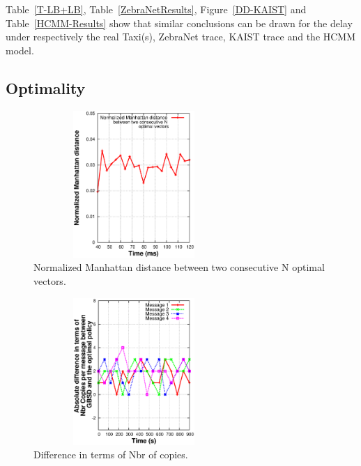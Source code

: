 Table~\ref{T-LB+LB}, Table~\ref{ZebraNetResults}, Figure~\ref{DD-KAIST} and Table~\ref{HCMM-Results} show that similar conclusions can be drawn for the delay under respectively the real Taxi(s), ZebraNet trace, KAIST trace and the HCMM model. 

\subsection{Optimality}
\label{GBSD:Optimality}

\begin{figure}[!h]
\centering
\includegraphics[width=3in,height=2.2in]{Chapitre3/AvgDistancePerCoordinate.eps}
\caption{Normalized Manhattan distance between two consecutive N optimal vectors.}
\label{Sensitivity}
\end{figure}

\begin{figure}[!h]
\centering
\includegraphics[width=3in,height=2.2in]{Chapitre3/NbrCopiesDiff.eps}
\caption{Difference in terms of Nbr of copies.}
\label{DiffinTermsOfNbrCopies}
\end{figure}

